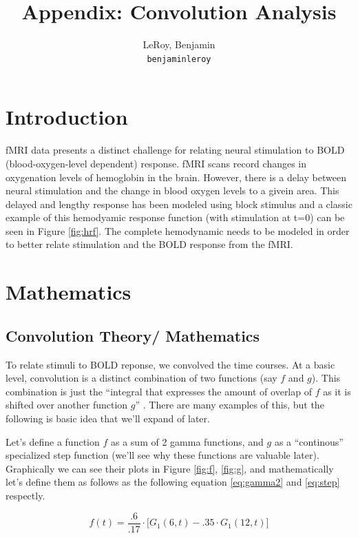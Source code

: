 \documentclass[11pt]{article}
\title{Appendix: Convolution Analysis}
\author{
  LeRoy, Benjamin\\
  \texttt{benjaminleroy}
}
\begin{document}
\maketitle


\section{Introduction}

fMRI data presents a distinct challenge for relating neural stimulation 
to BOLD (blood-oxygen-level dependent) response. fMRI scans record changes 
in oxygenation levels of hemoglobin in the brain. However, there is a delay 
between neural stimulation and the change in blood oxygen levels to a givein 
area. This delayed and lengthy response has been modeled using block stimulus 
and a classic example of this hemodyamic response function (with stimulation 
at t=0) can be seen in Figure \ref{fig:hrf}. The complete hemodynamic needs 
to be modeled in order to better relate  stimulation and the BOLD response 
from the fMRI.

\section{Mathematics}
\subsection{Convolution Theory/ Mathematics}

To relate stimuli to BOLD reponse, we convolved the time courses. At a basic 
level, convolution is a distinct combination of two functions (say $f$ and $g$).
 This combination is just the ``integral that expresses the amount of overlap of
  $f$ as it is shifted over another function $g$''  
  \cite{weissten2015convolution}. There are many examples of this, but the 
  following is basic idea that we'll expand of later. 

Let's define a function $f$ as a sum of 2 gamma functions, and $g$ as a 
``continous'' specialized step function  (we'll see why these functions are 
valuable later). Graphically we can see their plots in Figure \ref{fig:f}, 
\ref{fig:g}, and mathematically let's define them as follows as the following 
equation \ref{eq:gamma2} and \ref{eq:step} respectly.

\begin{equation} \label{eq:gamma2}
f(t)=\frac{.6}{.17}\cdot  \big[G_1(6,t)-.35 \cdot G_1(12,t) \big]
\end{equation}
\end{document}
